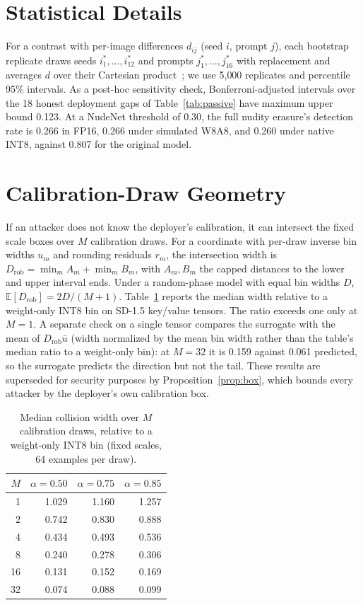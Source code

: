 \documentclass[conference]{IEEEtran}
\newcommand{\E}{\mathbb{E}}
\newcommand{\Drob}{D_{\mathrm{rob}}}
\begin{document}
\section{Statistical Details}
\label{app:stats}
For a contrast with per-image differences $d_{ij}$ (seed $i$, prompt $j$), each
bootstrap replicate draws seeds $i_1^*,\ldots,i_{12}^*$ and prompts
$j_1^*,\ldots,j_{16}^*$ with replacement and averages $d$ over their Cartesian
product~\cite{owen}; we use 5{,}000 replicates and percentile 95\% intervals. As a
post-hoc sensitivity check, Bonferroni-adjusted intervals over the 18 honest
deployment gaps of Table~\ref{tab:passive} have maximum upper bound 0.123. At a
NudeNet threshold of 0.30, the full nudity erasure's detection rate is 0.266 in FP16,
0.266 under simulated W8A8, and 0.260 under native INT8, against 0.807 for the
original model.

\section{Calibration-Draw Geometry}
\label{app:geometry}
If an attacker does not know the deployer's calibration, it can intersect the fixed
scale boxes over $M$ calibration draws. For a coordinate with per-draw inverse bin
widths $u_m$ and rounding residuals $r_m$, the intersection width is
$\Drob=\min_m A_m+\min_m B_m$, with $A_m,B_m$ the capped distances to the lower and
upper interval ends. Under a random-phase model with equal bin widths $D$,
$\E[\Drob]=2D/(M+1)$. Table~\ref{tab:geometry} reports the median width relative to a
weight-only INT8 bin on SD-1.5 key/value tensors. The ratio exceeds one only at
$M=1$. A separate check on a single tensor compares the surrogate with the mean of
$\Drob\bar u$ (width normalized by the mean bin width rather than the table's median ratio to
a weight-only bin): at $M=32$ it is 0.159 against 0.061 predicted, so the surrogate
predicts the direction but not the tail. These results are
superseded for security purposes by Proposition~\ref{prop:box}, which bounds every
attacker by the deployer's own calibration box.

\begin{table}[h]
\centering
\caption{Median collision width over $M$ calibration draws, relative to a
weight-only INT8 bin (fixed scales, 64 examples per draw).}
\label{tab:geometry}
\begin{tabular}{rrrr}
\toprule
$M$ & $\alpha=0.50$ & $\alpha=0.75$ & $\alpha=0.85$\\
\midrule
1 & 1.029 & 1.160 & 1.257 \\
2 & 0.742 & 0.830 & 0.888 \\
4 & 0.434 & 0.493 & 0.536 \\
8 & 0.240 & 0.278 & 0.306 \\
16 & 0.131 & 0.152 & 0.169 \\
32 & 0.074 & 0.088 & 0.099 \\
\bottomrule
\end{tabular}
\end{table}
\end{document}
